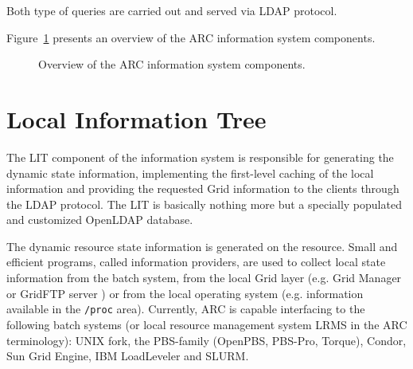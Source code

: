 \documentclass{article}
\begin{document}
Both type of queries are carried out and served via LDAP protocol.

Figure~\ref{fig:overview} presents an overview of the ARC information system
components.


\begin{figure}[hb]
\centering
{ 
{}
}
\caption{\label{fig:overview}Overview of the ARC information system components.}
\end{figure}


\section{Local Information Tree}

The LIT component of the information system is responsible
for generating the dynamic state information, implementing the first-level caching
of the local information and providing the requested Grid information to the clients 
through the LDAP protocol. The LIT is basically nothing more but a 
specially populated and customized OpenLDAP database.

The dynamic resource state information is generated on the resource.
Small and efficient programs, called information providers, are used to 
collect local state information from the batch system, from the local Grid layer 
(e.g. Grid Manager or GridFTP server \cite{grid-manager}) or from the
local operating system (e.g. information available in the \texttt{/proc} area).
Currently, ARC is capable interfacing to the following batch systems 
(or local resource management system LRMS in the ARC terminology): 
UNIX fork, the PBS-family (OpenPBS, PBS-Pro, Torque), Condor, Sun Grid Engine, IBM LoadLeveler and SLURM.  
\end{document}
